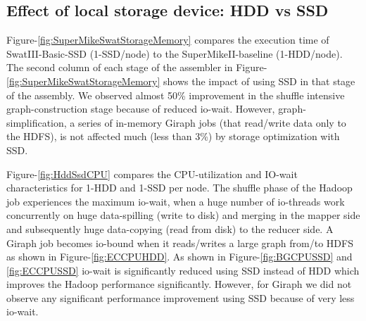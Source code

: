 \documentclass[conference]{IEEEtran}
\begin{document}
\subsection {Effect of local storage device: HDD vs SSD} \label{EffectOfSSD}
Figure-\ref{fig:SuperMikeSwatStorageMemory} compares the execution time of SwatIII-Basic-SSD (1-SSD/node) to the SuperMikeII-baseline (1-HDD/node).
The second column of each stage of the assembler in Figure-\ref{fig:SuperMikeSwatStorageMemory} shows the impact of using SSD in that stage of the assembly.
We observed almost 50\% improvement in the shuffle intensive graph-construction stage because of reduced io-wait. 
However, graph-simplification, a series of in-memory Giraph jobs (that read/write data only to the HDFS), is not affected much (less than 3\%) by storage optimization with SSD. 

Figure-\ref{fig:HddSsdCPU} compares the CPU-utilization and IO-wait characteristics for 1-HDD and 1-SSD per node.
The shuffle phase of the Hadoop job experiences the maximum io-wait, when a huge number of io-threads work concurrently on huge data-spilling (write to disk) and merging in the mapper side and subsequently huge data-copying (read from disk) to the reducer side. %
A Giraph job becomes io-bound when it reads/writes a large graph from/to HDFS as shown in Figure-\ref{fig:ECCPUHDD}.
As shown in Figure-\ref{fig:BGCPUSSD} and \ref{fig:ECCPUSSD} io-wait is significantly reduced using SSD instead of HDD which improves the Hadoop performance significantly. 
However, for Giraph we did not observe any significant performance improvement using SSD because of very less io-wait.
\end{document}
